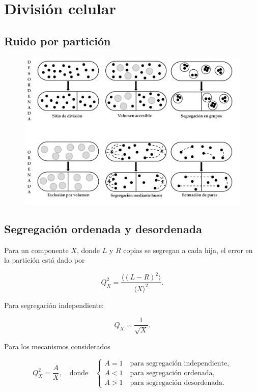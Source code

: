 \documentclass[xcolor=dvipsnames]{beamer}
\begin{document}
\section{Divisi\'on celular}

\subsection{Ruido por partici\'on}
\begin{frame}
\begin{figure}[p]
    \centering
    \includegraphics[width=\textwidth]{Pdiv-draws}
\end{figure}
\end{frame}

\subsection{Segregaci\'on ordenada y desordenada}
\begin{frame}

Para un componente $X$, donde $L$ y $R$ copias se segregan a cada hija, el error en la partici\'on est\'a dado por

$$Q_X^2 = \frac{\langle (L-R)^2 \rangle}{\langle X \rangle^2}. $$

Para segregaci\'on independiente:

$$Q_X = \frac{1}{\sqrt{X}}.$$

Para los mecanismos considerados

$$ Q_X^2 = \frac{A}{X}, \quad \text{donde} \quad 
\begin{cases}
A = 1 \quad \text{para segregaci\'on independiente,}\\
A < 1 \quad \text{para segregaci\'on ordenada,}\\
A > 1 \quad \text{para segregaci\'on desordenada.}
\end{cases} 
$$

\end{frame}
\end{document}
